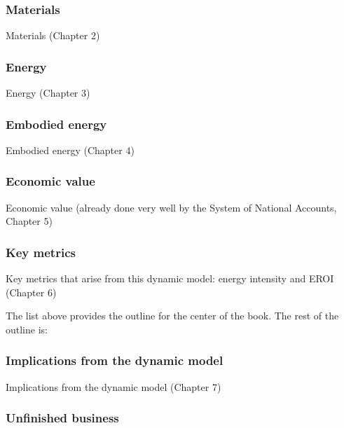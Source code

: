 \subsubsection{Materials}
\label{sec:materials}

Materials (Chapter 2)

\subsubsection{Energy}
\label{sec:energy}

Energy (Chapter 3)

\subsubsection{Embodied energy}
\label{sec:embodied_energy}

Embodied energy (Chapter 4)

\subsubsection{Economic value}
\label{sec:economic_value}

Economic value (already done very well by the System of National Accounts, Chapter 5)

\subsubsection{Key metrics}
\label{sec:key_metrics}

Key metrics that arise from this dynamic model: energy intensity and EROI (Chapter 6)

The list above provides the outline for the center of the book. The rest of the outline is:

\subsubsection{Implications from the dynamic model}
\label{sec:implications}

Implications from the dynamic model (Chapter 7)

\subsubsection{Unfinished business}
\label{sec:unfinished_business}

